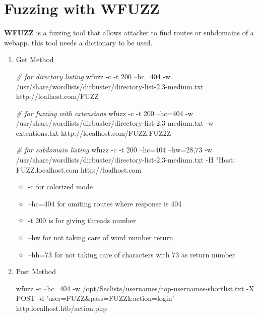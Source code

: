 \documentclass{assets/ipesethesis}
\newenvironment{Shaded}{\begin{snugshade}}{\end{snugshade}}
\newcommand{\CommentTok}[1]{\textcolor[rgb]{0.56,0.35,0.01}{\textit{#1}}}
\newcommand{\ExtensionTok}[1]{#1}
\newcommand{\NormalTok}[1]{#1}
\newcommand{\StringTok}[1]{\textcolor[rgb]{0.31,0.60,0.02}{#1}}
\providecommand{\tightlist}{%
  \setlength{\itemsep}{0pt}\setlength{\parskip}{0pt}}
\begin{document}
\hypertarget{fuzzing-with-wfuzz}{%
\section*{Fuzzing with WFUZZ}\label{fuzzing-with-wfuzz}}

\textbf{WFUZZ} is a fuzzing tool that allows attacker to find routes or subdomains of a webapp. this tool needs a dictionary to be used.

\begin{enumerate}
\def\labelenumi{\arabic{enumi}.}
\item
  Get Method

\begin{Shaded}
\begin{Highlighting}[]
\CommentTok{# for directory listing}
\ExtensionTok{wfuzz}\NormalTok{ -c -t 200 --hc=404 -w /usr/share/wordlists/dirbuster/directory-list-2.3-medium.txt http://loalhost.com/FUZZ}

\CommentTok{# for fuzzing with extensions}
\ExtensionTok{wfuzz}\NormalTok{ -c -t 200 --hc=404 -w /usr/share/wordlists/dirbuster/directory-list-2.3-medium.txt -w extentions.txt http://localhost.com/FUZZ.FUZ2Z}

\CommentTok{# for subdomain listing}
\ExtensionTok{wfuzz}\NormalTok{ -c -t 200 --hc=404 --hw=28,73 -w /usr/share/wordlists/dirbuster/directory-list-2.3-medium.txt -H }\StringTok{"Host: FUZZ.localhost.com http://loalhost.com}
\end{Highlighting}
\end{Shaded}

  \begin{itemize}
  \tightlist
  \item
    -c for colorized mode
  \item
    --hc=404 for omiting routes where response is 404
  \item
    -t 200 is for giving threads number
  \item
    --hw for not taking care of word number return
  \item
    --hh=73 for not taking care of characters with 73 as return number
  \end{itemize}
\item
  Post Method

\begin{Shaded}
\begin{Highlighting}[]
\ExtensionTok{wfuzz}\NormalTok{ -c --hc=404 -w /opt/Seclists/usernames/top-usernames-shortlist.txt -X POST -d }\StringTok{'user=FUZZ&pass=FUZZ&action=login'}\NormalTok{ http:localhost.htb/action.php}
\end{Highlighting}
\end{Shaded}
\end{enumerate}
\end{document}
